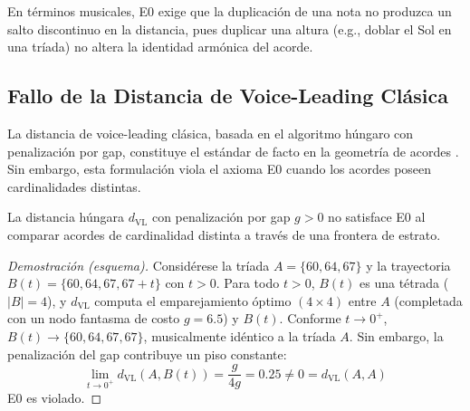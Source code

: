 En términos musicales, E0 exige que la duplicación de una nota no produzca un salto discontinuo en la distancia, pues duplicar una altura (e.g., doblar el Sol en una tríada) no altera la identidad armónica del acorde.

\subsection{Fallo de la Distancia de Voice-Leading Clásica}

La distancia de voice-leading clásica, basada en el algoritmo húngaro con penalización por gap, constituye el estándar de facto en la geometría de acordes \cite{tymoczkoGeometryMusicalChords2006}. Sin embargo, esta formulación viola el axioma E0 cuando los acordes poseen cardinalidades distintas.

\begin{proposition}
\label{prop:VL_falla}
La distancia húngara $d_{\text{VL}}$ con penalización por gap $g > 0$ no satisface E0 al comparar acordes de cardinalidad distinta a través de una frontera de estrato.
\end{proposition}

\begin{proof}[Demostración (esquema)]
Considérese la tríada $A = \{60, 64, 67\}$ y la trayectoria $B(t) = \{60, 64, 67, 67+t\}$ con $t > 0$. Para todo $t > 0$, $B(t)$ es una tétrada ($|B| = 4$), y $d_{\text{VL}}$ computa el emparejamiento óptimo $(4 \times 4)$ entre $A$ (completada con un nodo fantasma de costo $g = 6.5$) y $B(t)$. Conforme $t \to 0^+$, $B(t) \to \{60, 64, 67, 67\}$, musicalmente idéntico a la tríada $A$. Sin embargo, la penalización del gap contribuye un piso constante:
\begin{equation}
\lim_{t \to 0^+} d_{\text{VL}}(A, B(t)) = \frac{g}{4g} = 0.25 \neq 0 = d_{\text{VL}}(A, A)
\end{equation}
E0 es violado. 
\end{proof}

